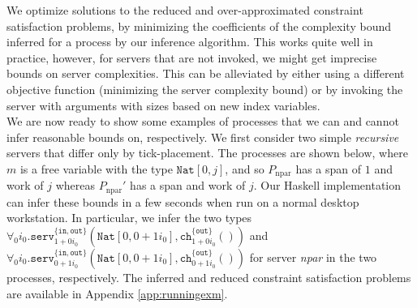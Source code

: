 We optimize solutions to the reduced and over-approximated constraint satisfaction problems, by minimizing the coefficients of the complexity bound inferred for a process by our inference algorithm. This works quite well in practice, however, for servers that are not invoked, we might get imprecise bounds on server complexities. This can be alleviated by either using a different objective function (minimizing the server complexity bound) or by invoking the server with arguments with sizes based on new index variables.\\

We are now ready to show some examples of processes that we can and cannot infer reasonable bounds on, respectively. We first consider two simple \textit{recursive} servers that differ only by tick-placement. The processes are shown below, where $m$ is a free variable with the type $\texttt{Nat}[0,j]$, and so $P_{\text{npar}}$ has a span of $1$ and work of $j$ whereas $P_{\text{npar}}'$ has a span and work of $j$. Our Haskell implementation can infer these bounds in a few seconds when run on a normal desktop workstation. In particular, we infer the two types $\forall_{0}{i_{0}}.\texttt{serv}^{\{\texttt{in}, \texttt{out}\}}_{1 + 0i_{0}}(\texttt{Nat}[0, 0 + 1i_{0}], \texttt{ch}^{\{\texttt{out}\}}_{1 + 0i_{0}}())$ and $\forall_{0}{i_{0}}.\texttt{serv}^{\{\texttt{in}, \texttt{out}\}}_{0 + 1i_{0}}(\texttt{Nat}[0, 0 + 1i_{0}], \texttt{ch}^{\{\texttt{out}\}}_{0 + 1i_{0}}())$ for server \textit{npar} in the two processes, respectively. The inferred and reduced constraint satisfaction problems are available in Appendix \ref{app:runningexm}.

